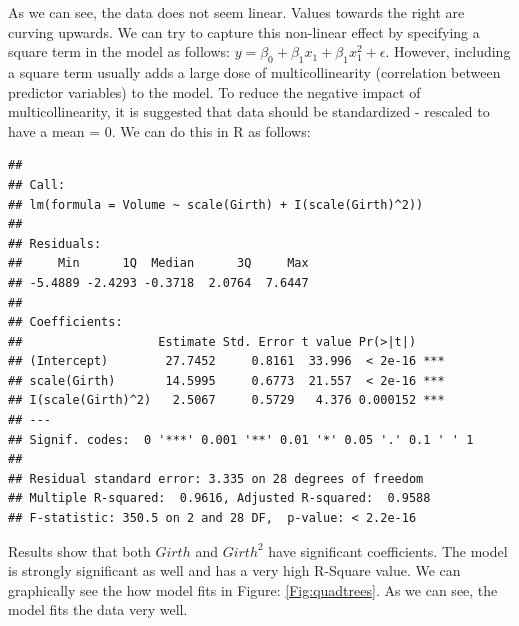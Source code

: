\documentclass[10pt, letterpaper, twoside]{memoir}\usepackage{knitr}
\begin{document}
As we can see, the data does not seem linear. Values towards the right are curving upwards. We can try to capture this non-linear effect by specifying a square term in the model as follows: $ y = \beta_0 + \beta_1 x_1 + \beta_1 x_1^2 + \epsilon $. However, including a square term usually adds a large dose of multicollinearity (correlation between predictor variables) to the model. To reduce the negative impact of multicollinearity, it is suggested that data should be standardized - rescaled to have a mean = 0. We can do this in R as follows:
\begin{knitrout}
\color{fgcolor}\begin{kframe}
\begin{alltt}
 \hlkwb{<-}  \hlopt{~}  \hlopt{+} \hlstd{(}\hlopt{^}\hlstd{))}
\end{alltt}
\begin{verbatim}
## 
## Call:
## lm(formula = Volume ~ scale(Girth) + I(scale(Girth)^2))
## 
## Residuals:
##     Min      1Q  Median      3Q     Max 
## -5.4889 -2.4293 -0.3718  2.0764  7.6447 
## 
## Coefficients:
##                   Estimate Std. Error t value Pr(>|t|)    
## (Intercept)        27.7452     0.8161  33.996  < 2e-16 ***
## scale(Girth)       14.5995     0.6773  21.557  < 2e-16 ***
## I(scale(Girth)^2)   2.5067     0.5729   4.376 0.000152 ***
## ---
## Signif. codes:  0 '***' 0.001 '**' 0.01 '*' 0.05 '.' 0.1 ' ' 1
## 
## Residual standard error: 3.335 on 28 degrees of freedom
## Multiple R-squared:  0.9616,	Adjusted R-squared:  0.9588 
## F-statistic: 350.5 on 2 and 28 DF,  p-value: < 2.2e-16
\end{verbatim}
\end{kframe}
\end{knitrout}

Results show that both $Girth$ and $Girth^2$ have significant coefficients. The model is strongly significant as well and has a very high R-Square value. We can graphically see the how model fits in Figure: \ref{Fig:quadtrees}. As we can see, the model fits the data very well.
\end{document}
